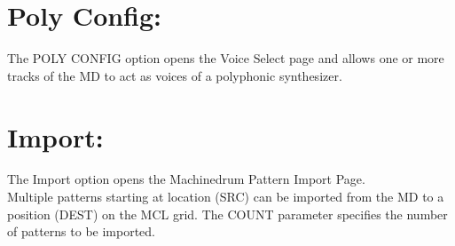 \section{Poly Config:}
The POLY CONFIG option opens the Voice Select page and allows one or more tracks of the MD to act as voices of a polyphonic synthesizer.
\section{Import:}
The Import option opens the Machinedrum Pattern Import Page.\\ 
Multiple patterns starting at location (SRC) can be imported from the MD to a position (DEST) on the MCL grid. The COUNT parameter specifies the number of patterns to be  imported.
